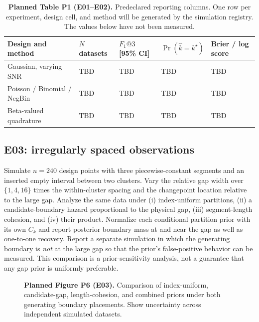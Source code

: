 \begin{table}[!htbp]
\centering\small
\caption{\textbf{Planned Table P1 (E01--E02).} Predeclared reporting columns.
One row per experiment, design cell, and method will be generated by the
simulation registry. The values below have not been measured.}
\label{tab:planned-recovery-paper}
\begin{tabularx}{0.94\textwidth}{@{}L{0.29\textwidth}L{0.15\textwidth}L{0.15\textwidth}L{0.15\textwidth}Y@{}}
\toprule
Design and method & $N$ datasets & $F_1@3$ [95\% CI] & $\Pr(\widehat k=k^\star)$ & Brier / log score \\
\midrule
Gaussian, varying SNR & TBD & TBD & TBD & TBD \\
Poisson / Binomial / NegBin & TBD & TBD & TBD & TBD \\
Beta-valued quadrature & TBD & TBD & TBD & TBD \\
\bottomrule
\end{tabularx}
\end{table}

\subsection{E03: irregularly spaced observations}
Simulate $n=240$ design points with three piecewise-constant segments and an
inserted empty interval between two clusters. Vary the relative gap width over
$\{1,4,16\}$ times the within-cluster spacing and the changepoint location
relative to the large gap. Analyze the same data under (i) index-uniform
partitions, (ii) a candidate-boundary hazard proportional to the physical gap,
(iii) segment-length cohesion, and (iv) their product. Normalize each
conditional partition prior with its own $C_k$ and report posterior boundary
mass at and near the gap as well as one-to-one recovery. Report a separate
simulation in which the generating boundary is \emph{not} at the large gap so
that the prior's false-positive behavior can be measured. This comparison is
a prior-sensitivity analysis, not a guarantee that any gap prior is uniformly
preferable.

\begin{figure}[!htbp]
\centering
{}
\hfill
{}
\caption{\textbf{Planned Figure P6 (E03).} Comparison of index-uniform,
candidate-gap, length-cohesion, and combined priors under both generating
boundary placements. Show uncertainty across independent simulated datasets.}
\label{fig:planned-irregular-paper}
\end{figure}

